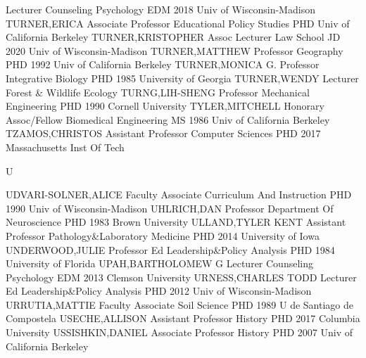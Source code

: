 \documentclass[
]{article}
\begin{document}
 \textbar Lecturer \textbar Counseling Psychology
\textbar EDM 2018 Univ of Wisconsin-Madison \textbar TURNER,ERICA
\textbar{}  \textbar Associate Professor
\textbar Educational Policy Studies \textbar PHD Univ of California
Berkeley \textbar TURNER,KRISTOPHER \textbar{} 
\textbar Assoc Lecturer \textbar Law School \textbar JD 2020 Univ of
Wisconsin-Madison \textbar TURNER,MATTHEW \textbar{} 
\textbar Professor \textbar Geography \textbar PHD 1992 Univ of
California Berkeley \textbar TURNER,MONICA G. \textbar{} 
\textbar Professor \textbar Integrative Biology \textbar PHD 1985
University of Georgia \textbar TURNER,WENDY \textbar{} 
\textbar Lecturer \textbar Forest \& Wildlife Ecology
\textbar TURNG,LIH-SHENG \textbar Professor \textbar{} 
\textbar Mechanical Engineering \textbar PHD 1990 Cornell University
\textbar TYLER,MITCHELL \textbar Honorary Assoc/Fellow \textbar{}
 \textbar Biomedical Engineering \textbar MS 1986 Univ of
California Berkeley \textbar TZAMOS,CHRISTOS \textbar Assistant
Professor \textbar{}  \textbar Computer Sciences
\textbar PHD 2017 Massachusetts Inst Of Tech \textbar{}

U

\textbar{}

UDVARI-SOLNER,ALICE \textbar{}  \textbar Faculty Associate
\textbar Curriculum And Instruction \textbar PHD 1990 Univ of
Wisconsin-Madison \textbar UHLRICH,DAN \textbar{} 
\textbar Professor \textbar Department Of Neuroscience \textbar PHD 1983
Brown University \textbar ULLAND,TYLER KENT \textbar{} 
\textbar Assistant Professor \textbar Pathology\&Laboratory Medicine
\textbar PHD 2014 University of Iowa \textbar UNDERWOOD,JULIE \textbar{}
 \textbar Professor \textbar Ed Leadership\&Policy Analysis
\textbar PHD 1984 University of Florida \textbar UPAH,BARTHOLOMEW G
\textbar{}  \textbar Lecturer \textbar Counseling Psychology
\textbar EDM 2013 Clemson University \textbar URNESS,CHARLES TODD
\textbar{}  \textbar Lecturer \textbar Ed Leadership\&Policy
Analysis \textbar PHD 2012 Univ of Wisconsin-Madison
\textbar URRUTIA,MATTIE \textbar{}  \textbar Faculty
Associate \textbar Soil Science \textbar PHD 1989 U de Santiago de
Compostela \textbar USECHE,ALLISON \textbar{} 
\textbar Assistant Professor \textbar History \textbar PHD 2017 Columbia
University \textbar USSISHKIN,DANIEL \textbar{} 
\textbar Associate Professor \textbar History \textbar PHD 2007 Univ of
California Berkeley \textbar{}
\end{document}
